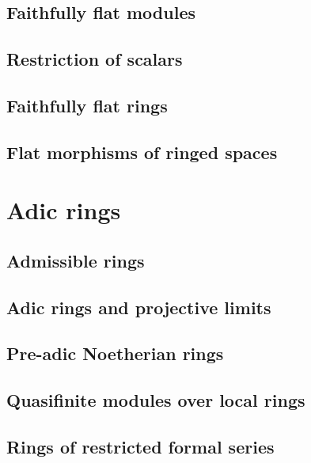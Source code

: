 \documentclass{book}
\begin{document}
\subsection{Faithfully flat modules}
\label{0-prelim-6.4}

\subsection{Restriction of scalars}
\label{0-prelim-6.5}

\subsection{Faithfully flat rings}
\label{0-prelim-6.6}

\subsection{Flat morphisms of ringed spaces}
\label{0-prelim-6.7}

\section{Adic rings}
\label{0-prelim-7}

\subsection{Admissible rings}
\label{0-prelim-7.1}

\subsection{Adic rings and projective limits}
\label{0-prelim-7.2}

\subsection{Pre-adic Noetherian rings}
\label{0-prelim-7.3}

\subsection{Quasifinite modules over local rings}
\label{0-prelim-7.4}

\subsection{Rings of restricted formal series}
\label{0-prelim-7.5}
\end{document}
